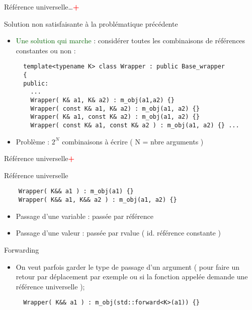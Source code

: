 \documentclass[compress,10pt,aspectratio=169]{beamer}
\begin{document}
  \begin{frame}[fragile]{Référence universelle\ldots\hspace*{9cm}\textcolor{red}{\Huge\bf +}}
  \scriptsize
  
  \begin{block}{\small Solution non satisfaisante à la problématique précédente}
  \begin{itemize}
    \item \textcolor{DarkGreen}{Une solution qui marche} : considérer toutes les 
          combinaisons de références constantes ou non :
  \begin{verbatim}
  template<typename K> class Wrapper : public Base_wrapper
  {
  public:
    ...
    Wrapper( K& a1, K& a2) : m_obj(a1,a2) {}
    Wrapper( const K& a1, K& a2) : m_obj(a1, a2) {}
    Wrapper( K& a1, const K& a2) : m_obj(a1, a2) {}
    Wrapper( const K& a1, const K& a2 ) : m_obj(a1, a2) {} ... 
  \end{verbatim}
    \item Problème : $2^{N}$ combinaisons à écrire ( N = nbre arguments )
  \end{itemize}
  \end{block}
  \end{frame}
  
  \begin{frame}[fragile]{Référence universelle\hspace*{9cm}\textcolor{red}{\Huge\bf +}}
  \scriptsize
  \begin{block}{\small Référence universelle}
  \begin{verbatim}
    Wrapper( K&& a1 ) : m_obj(a1) {}
    Wrapper( K&& a1, K&& a2 ) : m_obj(a1, a2) {}
  \end{verbatim}
  \begin{itemize}
    \item Passage d'une variable : passée par référence
    \item Passage d'une valeur   : passée par rvalue ( id. référence constante )
  \end{itemize}
  \end{block}
  \begin{block}{Forwarding}
  \begin{itemize}
    \item On veut parfois garder le type de passage d'un argument ( pour faire un 
          retour par déplacement par exemple ou si la fonction appelée demande une 
          référence universelle );
  \begin{verbatim}
  Wrapper( K&& a1 ) : m_obj(std::forward<K>(a1)) {}
  \end{verbatim}
  \end{itemize}
  \end{block}
  \end{frame}
    
\end{document}
